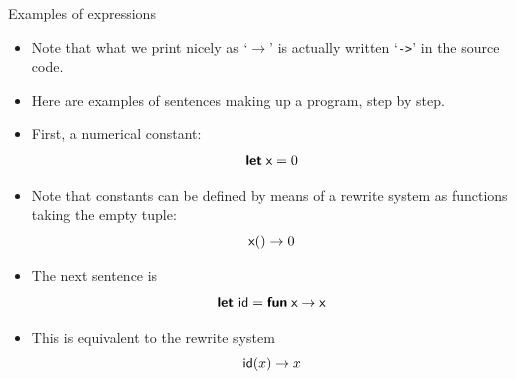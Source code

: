 %
\begin{frame}[fragile]{Examples of expressions}

  \begin{itemize}

    \item Note that what we print nicely as `\(\rightarrow\)' is
      actually written `\texttt{->}' in the source code.

    \item Here are examples of \OCaml sentences making up a program,
      step by step.

    \item First, a numerical constant:
      {\setlength{\abovedisplayskip}{2pt}
       \setlength{\belowdisplayskip}{2pt}
       \begin{equation*}
         \textsf{\textbf{let}}\; \textsf{x} = 0
       \end{equation*}}

    \item Note that constants can be defined by means of a rewrite
      system as functions taking the empty tuple:
      \begin{equation*}
        \textsf{x}() \rightarrow 0
      \end{equation*}

    \item The next sentence is
      {\setlength{\abovedisplayskip}{2pt}
       \setlength{\belowdisplayskip}{2pt}
      \begin{equation*}
        \textsf{\textbf{let}}\; \textsf{id} = \textsf{\textbf{fun}} \; \textsf{x} \rightarrow \textsf{x}
      \end{equation*}}

    \item This is equivalent to the rewrite system
      \begin{equation*}
        \textsf{id}(x) \rightarrow x
      \end{equation*}

  \end{itemize}

\end{frame}

